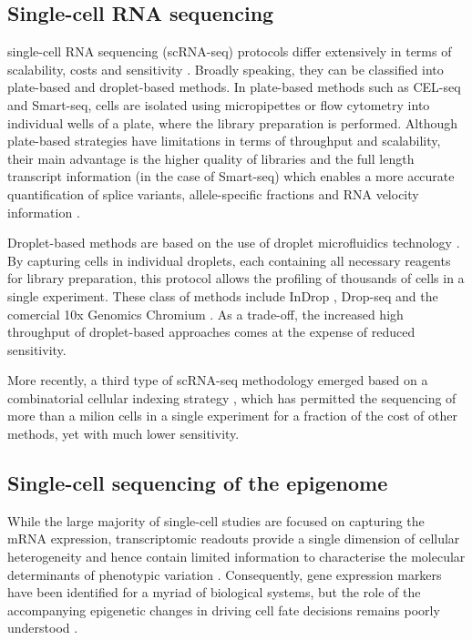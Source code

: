 \subsection{Single-cell RNA sequencing} \label{section:rna_expresssion}

single-cell RNA sequencing (scRNA-seq) protocols differ extensively in terms of scalability, costs and sensitivity \cite{Svensson2018, Lafzi2018}. Broadly speaking, they can be classified into plate-based and droplet-based methods. In plate-based methods such as CEL-seq \cite{Hashimshony2012} and Smart-seq\cite{Ramskold2012, Picelli2014}, cells are isolated using micropipettes or flow cytometry into individual wells of a plate, where the library preparation is performed. Although plate-based strategies have limitations in terms of throughput and scalability, their main advantage is the higher quality of libraries and the full length transcript information (in the case of Smart-seq) which enables a more accurate quantification of splice variants\cite{Huang2017}, allele-specific fractions\cite{Deng2014} and RNA velocity information \cite{LaManno2018}.
	
Droplet-based methods are based on the use of droplet microfluidics technology \cite{Zhang2019}. By capturing cells in individual droplets, each containing all necessary reagents for library preparation, this protocol allows the profiling of thousands of cells in a single experiment. These class of methods include InDrop \cite{Klein2015,Zilionis2016}, Drop-seq\cite{Macosko2015} and the comercial 10x Genomics Chromium \cite{Zheng2017}. As a trade-off, the increased high throughput of droplet-based approaches comes at the expense of reduced sensitivity\cite{Ziegenhain2017,Wang2019,Svensson2017}.

More recently, a third type of scRNA-seq methodology emerged based on a combinatorial cellular indexing strategy \cite{Cao2017,Rosenberg2018,Cao2019}, which has permitted the sequencing of more than a milion cells in a single experiment for a fraction of the cost of other methods, yet with much lower sensitivity.

\subsection{Single-cell sequencing of the epigenome}

While the large majority of single-cell studies are focused on capturing the mRNA expression, transcriptomic readouts provide a single dimension of cellular heterogeneity and hence contain limited information to characterise the molecular determinants of phenotypic variation \cite{Ritchie2015}. Consequently, gene expression markers have been identified for a myriad of biological systems, but the role of the accompanying epigenetic changes in driving cell fate decisions remains poorly understood \cite{Griffiths2018,Kelsey2017,Bheda2014}.


